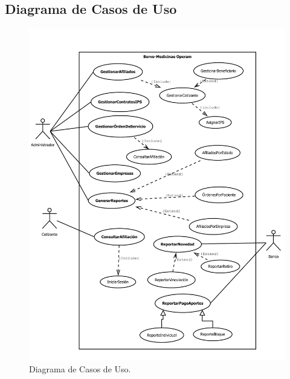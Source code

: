 \documentclass[12pt,a4paper]{article}
\begin{document}
\subsection{Diagrama de Casos de Uso}
\begin{figure}[H]
\centering
{\includegraphics[width=1 \textwidth]{use_cases_diagram.pdf} \par}
\caption{Diagrama de Casos de Uso.}
\end{figure}
\end{document}
